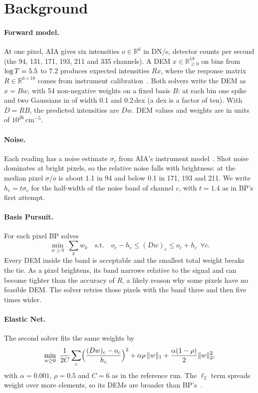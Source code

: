 \section{Background}
\label{sec:background}

\paragraph{Forward model.}
At one pixel, AIA gives six intensities $o\in\mathbb{R}^6$ in DN/s, detector counts per second (the 94, 131, 171, 193, 211 and 335\Ang{} channels). A DEM $x\in\mathbb{R}^{18}_{\ge 0}$ on bins from $\log T=5.5$ to $7.2$ produces expected intensities $Rx$, where the response matrix $R\in\mathbb{R}^{6\times 18}$ comes from instrument calibration~\cite{boerner2012calibration}. Both solvers write the DEM as $x=Bw$, with 54 non-negative weights on a fixed basis $B$: at each bin one spike and two Gaussians in \logT{} of width 0.1 and 0.2\,dex (a dex is a factor of ten). With $D=RB$, the predicted intensities are $Dw$. DEM values and weights are in units of $10^{26}\,\mathrm{cm}^{-5}$.

\paragraph{Noise.}
Each reading has a noise estimate $\sigma_c$ from AIA's instrument model~\cite{barnes2020aiapy}. Shot noise dominates at bright pixels, so the relative noise falls with brightness: at the median pixel $\sigma/o$ is about 1.1 in 94\Ang{} and below 0.1 in 171, 193 and 211\Ang. We write $h_c=t\sigma_c$ for the half-width of the noise band of channel $c$, with $t=1.4$ as in BP's first attempt.

\paragraph{Basis Pursuit.}
For each pixel BP solves
\begin{equation}
  \min_{w\ge 0}\ \sum_{k} w_k \quad\text{s.t.}\quad o_c-h_c\le (Dw)_c\le o_c+h_c\ \ \forall c.
  \label{eq:bp}
\end{equation}
Every DEM inside the band is acceptable and the smallest total weight breaks the tie. As a pixel brightens, its band narrows relative to the signal and can become tighter than the accuracy of $R$, a likely reason why some pixels have no feasible DEM. The solver retries those pixels with the band three and then five times wider.

\paragraph{Elastic Net.}
The second solver fits the same weights by
\begin{equation}
  \min_{w\ge 0}\ \frac{1}{2C}\sum_{c}\Bigl(\frac{(Dw)_c-o_c}{h_c}\Bigr)^2
  +\alpha\rho\,\|w\|_1+\frac{\alpha(1-\rho)}{2}\|w\|_2^2,
  \label{eq:enet}
\end{equation}
with $\alpha=0.001$, $\rho=0.5$ and $C=6$ as in the reference run. The $\ell_2$ term spreads weight over more elements, so its DEMs are broader than BP's~\cite{zou2005elastic}.

